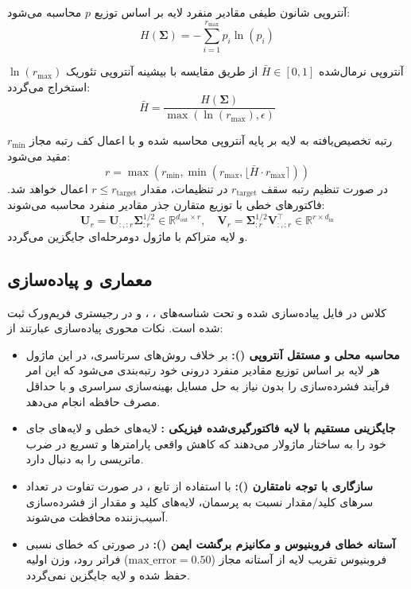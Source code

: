 آنتروپی شانون طیفی مقادیر منفرد لایه بر اساس توزیع $p$ محاسبه می‌شود:
\begin{equation}
H(\mathbf{\Sigma}) = - \sum_{i=1}^{r_{\text{max}}} p_i \ln(p_i)
\end{equation}

آنتروپی نرمال‌شده $\bar{H} \in [0, 1]$ از طریق مقایسه با بیشینه آنتروپی تئوریک $\ln(r_{\text{max}})$ استخراج می‌گردد:
\begin{equation}
\bar{H} = \frac{H(\mathbf{\Sigma})}{\max(\ln(r_{\text{max}}), \epsilon)}
\end{equation}

رتبه تخصیص‌یافته به لایه بر پایه آنتروپی محاسبه شده و با اعمال کف رتبه مجاز $r_{\text{min}}$ مقید می‌شود:
\begin{equation}
r = \max\left(r_{\text{min}}, \min\left(r_{\text{max}}, \lfloor \bar{H} \cdot r_{\text{max}} \rceil\right)\right)
\end{equation}
در صورت تنظیم رتبه سقف $r_{\text{target}}$ در تنظیمات، مقدار $r \le r_{\text{target}}$ اعمال خواهد شد. فاکتورهای خطی با توزیع متقارن جذر مقادیر منفرد محاسبه می‌شوند:
\begin{equation}
\mathbf{U}_r = \mathbf{U}_{:, :r} \mathbf{\Sigma}_{:r}^{1/2} \in \mathbb{R}^{d_{\text{out}} \times r}, \quad \mathbf{V}_r = \mathbf{\Sigma}_{:r}^{1/2} \mathbf{V}_{:, :r}^\top \in \mathbb{R}^{r \times d_{\text{in}}}
\end{equation}
و لایه متراکم با ماژول دو‌مرحله‌ای  جایگزین می‌گردد.

\subsection{معماری و پیاده‌سازی}
کلاس  در فایل  پیاده‌سازی شده و تحت شناسه‌های ، ،  و  در رجیستری فریم‌ورک ثبت شده است. نکات محوری پیاده‌سازی عبارتند از:
\begin{itemize}
    \item \textbf{محاسبه محلی و مستقل آنتروپی ():} بر خلاف روش‌های سرتاسری، در این ماژول هر لایه بر اساس توزیع مقادیر منفرد درونی خود رتبه‌بندی می‌شود که این امر فرآیند فشرده‌سازی را بدون نیاز به حل مسایل بهینه‌سازی سراسری و با حداقل مصرف حافظه انجام می‌دهد.
    \item \textbf{جایگزینی مستقیم با لایه فاکتورگیری‌شده فیزیکی :} لایه‌های خطی و لایه‌های  جای خود را به ساختار ماژولار  می‌دهند که کاهش واقعی پارامترها و تسریع در ضرب ماتریسی را به دنبال دارد.
    \item \textbf{سازگاری با توجه نامتقارن ():} با استفاده از تابع ، در صورت تفاوت در تعداد سرهای کلید/مقدار نسبت به پرسمان، لایه‌های کلید و مقدار از فشرده‌سازی آسیب‌زننده محافظت می‌شوند.
    \item \textbf{آستانه خطای فروبنیوس و مکانیزم برگشت ایمن ():} در صورتی که خطای نسبی فروبنیوس تقریب لایه از آستانه مجاز ($\text{max\_error}=0.50$) فراتر رود، وزن اولیه حفظ شده و لایه جایگزین نمی‌گردد.
\end{itemize}

